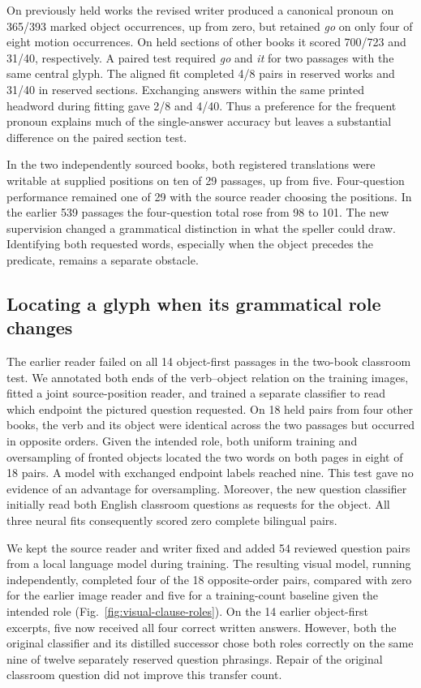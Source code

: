 \documentclass[12pt,a4paper]{article}
\providecommand{\DIFadd}[1]{{\protect\color{blue} \sf #1}} %
\begin{document}
\DIFadd{On previously held works the revised writer produced a canonical pronoun on 365/393 marked object occurrences, up from zero, but retained \textit{go} on only four of eight motion occurrences. On held sections of other books it scored 700/723 and 31/40, respectively. A paired test required \textit{go} and \textit{it} for two passages with the same central glyph. The aligned fit completed 4/8 pairs in reserved works and 31/40 in reserved sections. Exchanging answers within the same printed headword during fitting gave 2/8 and 4/40. Thus a preference for the frequent pronoun explains much of the single-answer accuracy but leaves a substantial difference on the paired section test.
}

\DIFadd{In the two independently sourced books, both registered translations were writable at supplied positions on ten of 29 passages, up from five. Four-question performance remained one of 29 with the source reader choosing the positions. In the earlier 539 passages the four-question total rose from 98 to 101. The new supervision changed a grammatical distinction in what the speller could draw. Identifying both requested words, especially when the object precedes the predicate, remains a separate obstacle.
}

\subsection*{\DIFadd{Locating a glyph when its grammatical role changes}}
\DIFadd{The earlier reader failed on all 14 object-first passages in the two-book classroom test. We annotated both ends of the verb--object relation on the training images, fitted a joint source-position reader, and trained a separate classifier to read which endpoint the pictured question requested. On 18 held pairs from four other books, the verb and its object were identical across the two passages but occurred in opposite orders. Given the intended role, both uniform training and oversampling of fronted objects located the two words on both pages in eight of 18 pairs. A model with exchanged endpoint labels reached nine. This test gave no evidence of an advantage for oversampling. Moreover, the new question classifier initially read both English classroom questions as requests for the object. All three neural fits consequently scored zero complete bilingual pairs.
}

\DIFadd{We kept the source reader and writer fixed and added 54 reviewed question pairs from a local language model during training. The resulting visual model, running independently, completed four of the 18 opposite-order pairs, compared with zero for the earlier image reader and five for a training-count baseline given the intended role (Fig.~\ref{fig:visual-clause-roles}). On the 14 earlier object-first excerpts, five now received all four correct written answers. However, both the original classifier and its distilled successor chose both roles correctly on the same nine of twelve separately reserved question phrasings. Repair of the original classroom question did not improve this transfer count.
}
\end{document}
